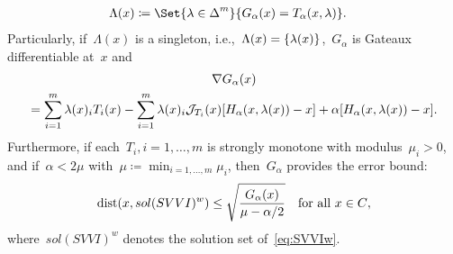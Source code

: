 \documentclass[../../main]{subfiles}
\begin{document}
\begin{example}
\begin{description}
\begin{align}
                \Lambda(x) &\coloneqq \Set{\lambda \in \simplex^m}{G_\alpha(x) = T_\alpha(x, \lambda)}
            .\end{align}
            Particularly, if~$\Lambda(x)$ is a singleton, i.e.,~$\Lambda(x) = \lbrace\lambda(x)\rbrace$,~$G_\alpha$ is Gateaux differentiable at~$x$ and
            \begin{multline}
                \nabla G_\alpha(x) \\
                = \sum_{i = 1}^{m} \lambda(x)_i T_i(x) - \sum_{i = 1}^{m} \lambda(x)_i \mathcal{J}_{T_i}(x) [H_\alpha(x, \lambda(x)) - x] + \alpha [H_\alpha(x, \lambda(x)) - x]
            .\end{multline}
            Furthermore, if each~$T_i, i = 1, \dots, m$ is strongly monotone with modulus~$\mu_i > 0$, and if~$\alpha < 2 \mu$ with~$\mu \coloneqq \min_{i = 1, \dots, m} \mu_i$, then~$G_\alpha$ provides the error bound:
            \[
                \operatorname{dist}(x, sol(SVVI)^w) \le \sqrt{\frac{G_\alpha(x)}{\mu - \alpha / 2}} \quad \text{for all~$x \in C$}
            ,\] 
            where~$sol(SVVI)^w$ denotes the solution set of~\cref{eq:SVVIw}.
    \end{description}
\end{example}
\end{document}
